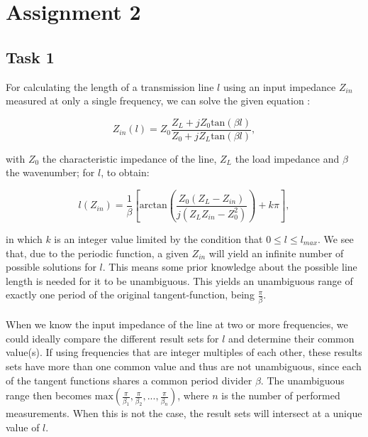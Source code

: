 \documentclass[11pt,titlepage]{report}
\begin{document}
\chapter{Assignment 2}
\section{Task 1}
For calculating the length of a transmission line $l$ using an input impedance $Z_{in}$ measured at only a single frequency, we can solve the given equation \cite[67]{epo4-manual}: 

\begin{equation}
\label{eq:ass2-Zin}
	Z_{in}(l) = Z_0 \frac{Z_L+jZ_0\mathrm{tan}(\beta l)}{Z_0+jZ_L\mathrm{tan}(\beta l)},
\end{equation}

with $Z_0$ the characteristic impedance of the line, $Z_L$ the load impedance and $\beta$ the wavenumber; for $l$, to obtain:

\begin{equation}
\label{eq:ass2-l}
	l(Z_{in}) = \frac{1}{\beta}\left[\mathrm{arctan}\left(\frac{Z_0 (Z_L - Z_{in})}{j(Z_L Z_{in} - Z_0^2)}\right) + k\pi\right],
\end{equation}

in which $k$ is an integer value limited by the condition that $0 \le l \le l_{max}$. We see that, due to the periodic function, a given $Z_{in}$ will yield an infinite number of possible solutions for $l$. This means some prior knowledge about the possible line length is needed for it to be unambiguous. This yields an unambiguous range of exactly one period of the original tangent-function, being $\frac{\pi}{\beta}$.
\\
\\
When we know the input impedance of the line at two or more frequencies, we could ideally compare the different result sets for $l$ and determine their common value(s). If using frequencies that are integer multiples of each other, these results sets have more than one common value and thus are not unambiguous, since each of the tangent functions shares a common period divider $\beta$. The unambiguous range then becomes $\mathrm{max}\left(\frac{\pi}{\beta_1}, \frac{\pi}{\beta_2}, ... , \frac{\pi}{\beta_n}\right)$, where $n$ is the number of performed measurements. When this is not the case, the result sets will intersect at a unique value of $l$.
\end{document}
